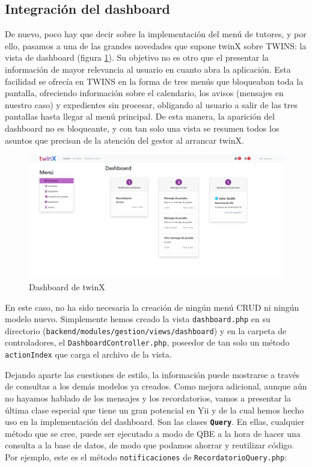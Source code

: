 \subsection{Integración del dashboard}

De nuevo, poco hay que decir sobre la implementación del menú de tutores, y por ello, pasamos a una de las grandes novedades que supone twinX sobre TWINS: la vista de dashboard (figura \ref{fig:dashboardtwinX}). Su objetivo no es otro que el presentar la información de mayor relevancia al usuario en cuanto abra la aplicación. Esta facilidad se ofrecía en TWINS en la forma de tres menús que bloqueaban toda la pantalla, ofreciendo información sobre el calendario, los avisos (mensajes en nuestro caso) y expedientes sin procesar, obligando al usuario a salir de las tres pantallas hasta llegar al menú principal. De esta manera, la aparición del dashboard no es bloqueante, y con tan solo una vista se resumen todos los asuntos que precisan de la atención del gestor al arrancar twinX.

\begin{figure}
	\centering
	\includegraphics[width=\linewidth]{img/Capturas de twinX/dashboard}
	\caption{Dashboard de twinX}
	\label{fig:dashboardtwinX}
\end{figure}

En este caso, no ha sido necesaria la creación de ningún menú CRUD ni ningún modelo nuevo. Simplemente hemos creado la vista \texttt{dashboard.php} en su directorio (\texttt{backend/modules/gestion/views/dashboard}) y en la carpeta de controladores, el \texttt{DashboardController.php}, poseedor de tan solo un método \texttt{actionIndex} que carga el archivo de la vista.

Dejando aparte las cuestiones de estilo, la información puede mostrarse a través de consultas a los demás modelos ya creados. Como mejora adicional, aunque aún no hayamos hablado de los mensajes y los recordatorios, vamos a presentar la última clase especial que tiene un gran potencial en Yii y de la cual hemos hecho uso en la implementación del dashboard. Son las clases \textbf{\texttt{Query}}. En ellas, cualquier método que se cree, puede ser ejecutado a modo de QBE a la hora de hacer una consulta a la base de datos, de modo que podamos ahorrar y reutilizar código. Por ejemplo, este es el método \texttt{notificaciones} de \texttt{RecordatorioQuery.php}:

